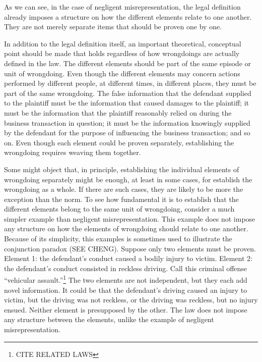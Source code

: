 \documentclass[
  10pt,
  dvipsnames,enabledeprecatedfontcommands]{scrartcl}
\begin{document}
As we can see, in the case of negligent misrepresentation, the legal
definition already imposes a structure on how the different elements
relate to one another. They are not merely separate items that should be
proven one by one.

In addition to the legal definition itself, an important theoretical,
conceptual point should be made that holds regardless of how wrongdoings
are actually defined in the law. The different elements should be part
of the same episode or unit of wrongdoing. Even though the different
elements may concern actions performed by different people, at different
times, in different places, they must be part of the same wrongdoing.
The false information that the defendant supplied to the plaintiff must
be the information that caused damages to the plaintiff; it must be the
information that the plaintiff reasonably relied on during the business
transaction in question; it must be the information knowingly supplied
by the defendant for the purpose of influencing the business
transaction; and so on. Even though each element could be proven
separately, establishing the wrongdoing requires weaving them together.

Some might object that, in principle, establishing the individual
elements of wrongdoing separately might be enough, at least in some
cases, for establish the wrongdoing as a whole. If there are such cases,
they are likely to be more the exception than the norm. To see how
fundamental it is to establish that the different elements belong to the
same unit of wrongdoing, consider a much simpler example than negligent
misrepresentation. This example does not impose any structure on how the
elements of wrongdoing should relate to one another. Because of its
simplicity, this examples is sometimes used to illustrate the
conjunction paradox (SEE CHENG). Suppose only two elements must be
proven. Element 1: the defendant's conduct caused a bodily injury to
victim. Element 2: the defendant's conduct consisted in reckless
driving. Call this criminal offense ``vehicular assault.''\footnote{CITE
  RELATED LAWS} The two elements are not independent, but they each add
novel information. It could be that the defendant's driving caused an
injury to victim, but the driving was not reckless, or the driving was
reckless, but no injury ensued. Neither element is presupposed by the
other. The law does not impose any structure between the elements,
unlike the example of negligent misrepresentation.
\end{document}

